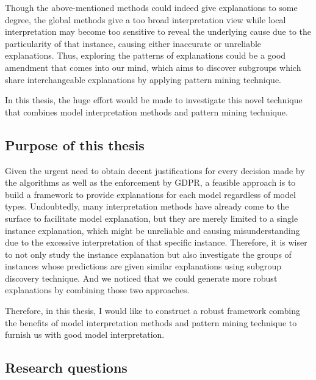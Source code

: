 Though the above-mentioned methods could indeed give explanations to some degree, the global methods give a too broad interpretation view while local interpretation may become too sensitive to reveal the underlying cause due to the particularity of that instance, causing either inaccurate or unreliable explanations. Thus, exploring the patterns of explanations could be a good amendment that comes into our mind, which aims to discover subgroups which share interchangeable explanations by applying pattern mining technique. 

In this thesis, the huge effort would be made to investigate this novel technique that combines model interpretation methods and pattern mining technique. 

\subsection{Purpose of this thesis}


Given the urgent need to obtain decent justifications for every decision made by the algorithms as well as the enforcement by GDPR, a feasible approach is to build a framework to provide explanations for each model regardless of model types. Undoubtedly, many interpretation methods have already come to the surface to facilitate model explanation, but they are merely limited to a single instance explanation, which might be unreliable and causing misunderstanding due to the excessive interpretation of that specific instance. Therefore, it is wiser to not only study the instance explanation but also investigate the groups of instances whose predictions are given similar explanations using subgroup discovery technique. And we noticed that we could generate more robust explanations by combining those two approaches. 

Therefore, in this thesis, I would like to construct a robust framework combing the benefits of model interpretation methods and pattern mining technique to furnish us with good model interpretation. 


\subsection{Research questions}

